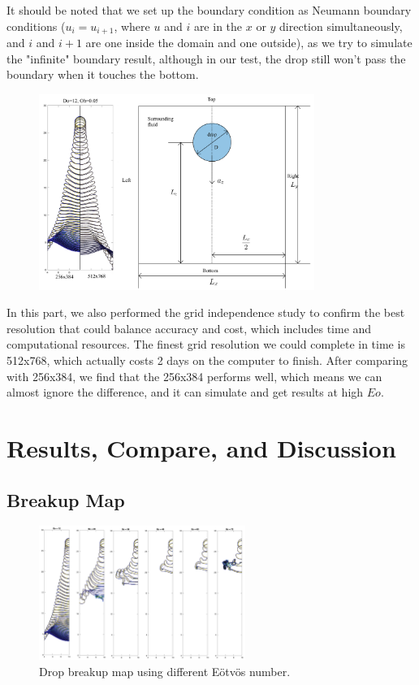 \documentclass[12pt]{article}
\begin{document}
It should be noted that we set up the boundary condition as Neumann boundary conditions ($u_i = u_{i+1}$, where $u$ and $i$ are in the $x$ or $y$ direction simultaneously, and $i$ and $i+1$ are one inside the domain and one outside), as we try to simulate the "infinite" boundary result, although in our test, the drop still won't pass the boundary when it touches the bottom.

\begin{figure}[H]
    \centering
    \includegraphics[width=0.8\textwidth]{Latex/figures/Domain_grid_indep.jpg}
    \label{deformation}
\end{figure}

In this part, we also performed the grid independence study to confirm the best resolution that could balance accuracy and cost, which includes time and computational resources. The finest grid resolution we could complete in time is 512x768, which actually costs 2 days on the computer to finish. After comparing with 256x384, we find that the 256x384 performs well, which means we can almost ignore the difference, and it can simulate and get results at high $Eo$.

\section{Results, Compare, and Discussion}

\subsection{Breakup Map}

\begin{figure}[H]
    \centering
    \includegraphics[width=0.6\textwidth]{figures/Eo_effect.jpg}
    \caption{Drop breakup map using different Eötvös number.}
    \label{fig:deformation}
\end{figure}
\end{document}
